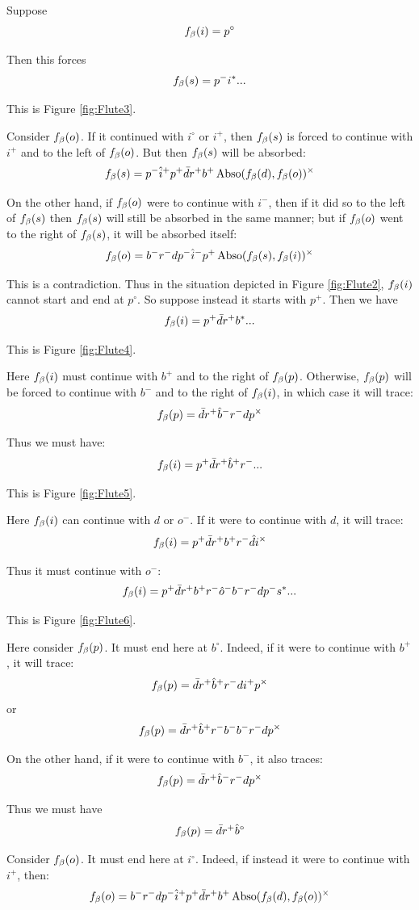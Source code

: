 Suppose 
\[
f_\beta(i) = p^\circ
\]

Then this forces
\[
f_\beta(s) = p^- i^*...
\]

This is Figure \ref{fig:Flute3}.

Consider $f_\beta(o)$. If it continued with $i^\circ$ or $i^+$, then $f_\beta(s)$ is forced to continue with $i^+$ and to the left of $f_\beta(o)$. But then $f_\beta(s)$ will be absorbed:
\[
f_\beta(s) = p^- \hat{i}^+ p^+ \bar{d} r^+ b^+ \operatorname{Abso}(f_\beta(d), f_\beta(o))^\times
\]

On the other hand, if $f_\beta(o)$ were to continue with $i^-$, then if it did so to the left of $f_\beta(s)$ then $f_\beta(s)$ will still be absorbed in the same manner; but if $f_\beta(o)$ went to the right of $f_\beta(s)$, it will be absorbed itself:
\[
f_\beta(o) = b^- r^- d p^- \hat{i}^- p^+ \operatorname{Abso}(f_\beta(s), f_\beta(i))^\times
\]

This is a contradiction. Thus in the situation depicted in Figure \ref{fig:Flute2}, $f_\beta(i)$ cannot start and end at $p^\circ$. So suppose instead it starts with $p^+$. Then we have
\[
f_\beta(i) = p^+ \bar{d} r^+ b^*...
\]

This is Figure \ref{fig:Flute4}.

Here $f_\beta(i)$ must continue with $b^+$ and to the right of $f_\beta(p)$. Otherwise, $f_\beta(p)$ will be forced to continue with $b^-$ and to the right of $f_\beta(i)$, in which case it will trace:
\[
f_\beta(p) = \bar{d} r^+ \hat{b}^- r^- d p^\times
\]

Thus we must have:
\[
f_\beta(i) = p^+ \bar{d} r^+ \hat{b}^+ r^-...
\]

This is Figure \ref{fig:Flute5}.

Here $f_\beta(i)$ can continue with $d$ or $o^-$. If it were to continue with $d$, it will trace:
\[
f_\beta(i) = p^+ \bar{d} r^+ b^+ r^- \hat{d} i^\times
\]

Thus it must continue with $o^-$:
\[
f_\beta(i) = p^+ \bar{d} r^+ b^+ r^- \hat{o}^- b^- r^- d p^- s^*...
\]

This is Figure \ref{fig:Flute6}.

Here consider $f_\beta(p)$. It must end here at $b^\circ$. Indeed, if it were to continue with $b^+$, it will trace:
\[
f_\beta(p) = \bar{d} r^+ \hat{b}^+ r^- d i^+ p^\times
\]
or
\[
f_\beta(p) = \bar{d} r^+ \hat{b}^+ r^- b^- b^- r^- d  p^\times
\]

On the other hand, if it were to continue with $b^-$, it also traces:
\[
f_\beta(p) = \bar{d} r^+ \hat{b}^- r^- d p^\times
\]

Thus we must have
\[
f_\beta(p) = \bar{d} r^+ \hat{b}^\circ
\]


Consider $f_\beta(o)$. It must end here at $i^\circ$. Indeed, if instead it were to continue with $i^+$, then:
\[
f_\beta(o) = b^- r^- d p^- \hat{i}^+ p^+ \bar{d} r^+ b^+ \operatorname{Abso}(f_\beta(d), f_\beta(o))^\times
\]

